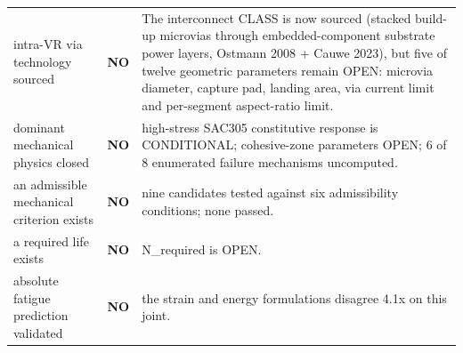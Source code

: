\documentclass[10pt,]{article}
\begin{document}
\begin{longtable}[]{@{}lll@{}}
\begin{minipage}[t]{0.30\columnwidth}
intra-VR via technology sourced\strut
\end{minipage} & \begin{minipage}[t]{0.30\columnwidth}\raggedright
\textbf{NO}\strut
\end{minipage} & \begin{minipage}[t]{0.30\columnwidth}\raggedright
The interconnect CLASS is now sourced (stacked build-up microvias
through embedded-component substrate power layers, Ostmann 2008 + Cauwe
2023), but five of twelve geometric parameters remain OPEN: microvia
diameter, capture pad, landing area, via current limit and per-segment
aspect-ratio limit.\strut
\end{minipage}\tabularnewline
\begin{minipage}[t]{0.30\columnwidth}\raggedright
dominant mechanical physics closed\strut
\end{minipage} & \begin{minipage}[t]{0.30\columnwidth}\raggedright
\textbf{NO}\strut
\end{minipage} & \begin{minipage}[t]{0.30\columnwidth}\raggedright
high-stress SAC305 constitutive response is CONDITIONAL; cohesive-zone
parameters OPEN; 6 of 8 enumerated failure mechanisms uncomputed.\strut
\end{minipage}\tabularnewline
\begin{minipage}[t]{0.30\columnwidth}\raggedright
an admissible mechanical criterion exists\strut
\end{minipage} & \begin{minipage}[t]{0.30\columnwidth}\raggedright
\textbf{NO}\strut
\end{minipage} & \begin{minipage}[t]{0.30\columnwidth}\raggedright
nine candidates tested against six admissibility conditions; none
passed.\strut
\end{minipage}\tabularnewline
\begin{minipage}[t]{0.30\columnwidth}\raggedright
a required life exists\strut
\end{minipage} & \begin{minipage}[t]{0.30\columnwidth}\raggedright
\textbf{NO}\strut
\end{minipage} & \begin{minipage}[t]{0.30\columnwidth}\raggedright
N\_required is OPEN.\strut
\end{minipage}\tabularnewline
\begin{minipage}[t]{0.30\columnwidth}\raggedright
absolute fatigue prediction validated\strut
\end{minipage} & \begin{minipage}[t]{0.30\columnwidth}\raggedright
\textbf{NO}\strut
\end{minipage} & \begin{minipage}[t]{0.30\columnwidth}\raggedright
the strain and energy formulations disagree 4.1x on this joint.\strut
\end{minipage}\tabularnewline
\bottomrule
\end{longtable}
\end{document}
